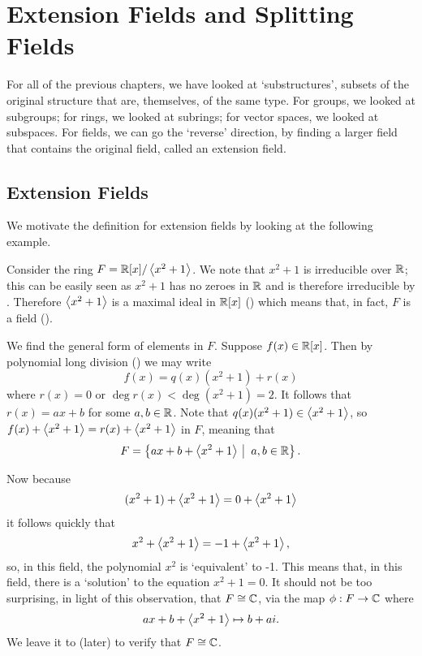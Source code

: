 \chapter{Extension Fields and Splitting Fields}
For all of the previous chapters, we have looked at `substructures', subsets of the original structure that are, themselves, of the same type. For groups, we looked at subgroups; for rings, we looked at subrings; for vector spaces, we looked at subspaces. For fields, we can go the `reverse' direction, by finding a larger field that contains the original field, called an extension field.

\section{Extension Fields}
We motivate the definition for extension fields by looking at the following example.

\begin{example}\label{example-R[x]-mod-x^2+1-is-isomorphic-to-C}
    Consider the ring $F = \mathbb{R}[x]/\left\langle x^2+1\right\rangle$. We note that $x^2 + 1$ is irreducible over $\mathbb{R}$; this can be easily seen as $x^2+1$ has no zeroes in $\mathbb{R}$ and is therefore irreducible by . Therefore $\left\langle x^2+1\right\rangle$ is a maximal ideal in $\mathbb{R}[x]$ () which means that, in fact, $F$ is a field ().

    We find the general form of elements in $F$. Suppose $f(x) \in \mathbb{R}[x]$. Then by polynomial long division () we may write
    \[
        f(x) = q(x)(x^2+1) + r(x)
    \]
    where $r(x) = 0$ or $\deg r(x) < \deg(x^2+1) = 2$. It follows that $r(x) = ax + b$ for some $a, b \in \mathbb{R}$. Note that $q(x)(x^2+1) \in \left\langle x^2+1\right\rangle$, so $f(x) + \left\langle x^2+1\right\rangle = r(x) + \left\langle x^2+1\right\rangle$ in $F$, meaning that
    \[
        F = \left\{ax + b + \princ{x^2+1} \vert a,b\in \R\right\}.
    \]

    Now because
    \[
        (x^2 + 1) + \left\langle x^2 + 1\right\rangle = 0 + \left\langle x^2+1\right\rangle
    \]
    it follows quickly that
    \[
        x^2 + \left\langle x^2 + 1\right\rangle = -1 + \left\langle x^2+1\right\rangle,
    \]
    so, in this field, the polynomial $x^2$ is `equivalent' to -1. This means that, in this field, there is a `solution' to the equation $x^2 + 1 = 0$. It should not be too surprising, in light of this observation, that $F \cong \mathbb{C}$, via the map $\phi: F \to \mathbb{C}$ where
    \[
        ax + b + \left\langle x^2 + 1\right\rangle \mapsto b + ai.
    \]
    We leave it to  (later) to verify that $F \cong \mathbb{C}$.
\end{example}

